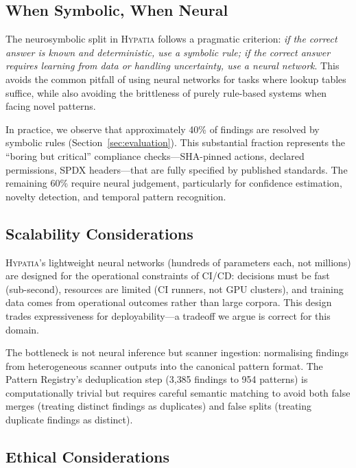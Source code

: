 \documentclass[11pt,a4paper]{article}
\begin{document}
\subsection{When Symbolic, When Neural}

The neurosymbolic split in \textsc{Hypatia} follows a pragmatic criterion: \emph{if the correct answer is known and deterministic, use a symbolic rule; if the correct answer requires learning from data or handling uncertainty, use a neural network}. This avoids the common pitfall of using neural networks for tasks where lookup tables suffice, while also avoiding the brittleness of purely rule-based systems when facing novel patterns.

In practice, we observe that approximately 40\% of findings are resolved by symbolic rules (Section~\ref{sec:evaluation}). This substantial fraction represents the ``boring but critical'' compliance checks---SHA-pinned actions, declared permissions, SPDX headers---that are fully specified by published standards. The remaining 60\% require neural judgement, particularly for confidence estimation, novelty detection, and temporal pattern recognition.

\subsection{Scalability Considerations}

\textsc{Hypatia}'s lightweight neural networks (hundreds of parameters each, not millions) are designed for the operational constraints of CI/CD: decisions must be fast (sub-second), resources are limited (CI runners, not GPU clusters), and training data comes from operational outcomes rather than large corpora. This design trades expressiveness for deployability---a tradeoff we argue is correct for this domain.

The bottleneck is not neural inference but scanner ingestion: normalising findings from heterogeneous scanner outputs into the canonical pattern format. The Pattern Registry's deduplication step (3{,}385 findings to 954 patterns) is computationally trivial but requires careful semantic matching to avoid both false merges (treating distinct findings as duplicates) and false splits (treating duplicate findings as distinct).

\subsection{Ethical Considerations}
\end{document}

